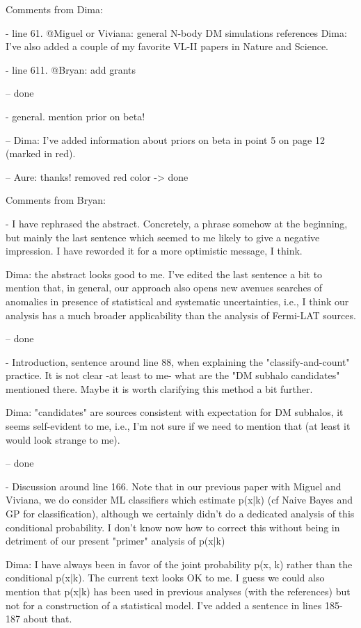 
Comments from Dima:

- line 61. @Miguel or Viviana: general N-body DM simulations references
Dima: I've also added a couple of my favorite VL-II papers in Nature and Science.

- line 611. @Bryan: add grants

-- done

- general. mention prior on beta!

-- Dima: I've added information about priors on beta in point 5 on page 12 (marked in red).

-- Aure: thanks! removed red color -> done

Comments from Bryan:

- I have rephrased the abstract. Concretely, a phrase somehow at the beginning, but mainly the last sentence which seemed to me likely to give a negative impression. I have reworded it for a more optimistic message, I think.

Dima: the abstract looks good to me. I've edited the last sentence a bit to mention that, in general, our approach also opens new avenues searches of anomalies in presence of statistical and systematic uncertainties, i.e., I think our analysis has a much broader applicability than the analysis of Fermi-LAT sources.

-- done

- Introduction, sentence around line 88, when explaining the "classify-and-count" practice. It is not clear -at least to me- what are the "DM subhalo candidates" mentioned there. Maybe it is worth clarifying this method a bit further.

Dima: "candidates" are sources consistent with expectation for DM subhalos, it seems self-evident to me, i.e., I'm not sure if we need to mention that (at least it would look strange to me).

-- done

- Discussion around line 166. Note that in our previous paper with Miguel and Viviana, we do consider ML classifiers which estimate p(x|k) (cf Naive Bayes and GP for classification), although we certainly didn't do a dedicated analysis of this conditional probability. I don't know now how to correct this without being in detriment of our present "primer" analysis of p(x|k)

Dima: I have always been in favor of the joint probability p(x, k) rather than the conditional p(x|k). The current text looks OK to me. I guess we could also mention that p(x|k) has been used in previous analyses (with the references) but not for a construction of a statistical model.
I've added a sentence in lines 185-187 about that.

